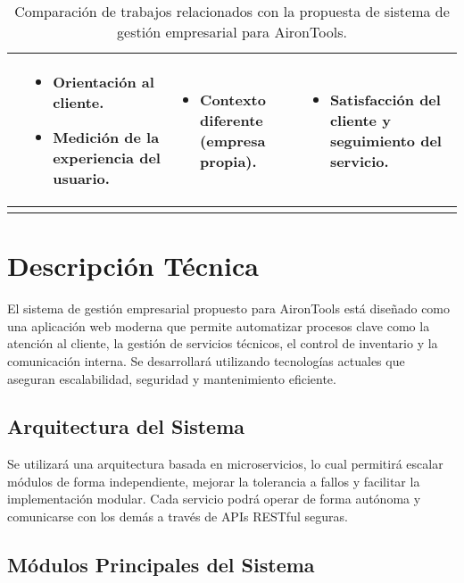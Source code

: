 \begin{longtable}{|p{}|p{}|p{}|p{}|}
    \cite{Patino2019} &
    \begin{itemize}
        \item Orientación al cliente.
        \item Medición de la experiencia del usuario.
    \end{itemize} &
    \begin{itemize}
        \item Contexto diferente (empresa propia).
    \end{itemize} &
    \begin{itemize}
        \item Satisfacción del cliente y seguimiento del servicio.
    \end{itemize} \\
    \hline
    \caption{Comparación de trabajos relacionados con la propuesta de sistema de gestión empresarial para AironTools.}
    \label{tabla:trabajosRelacionados}
    \end{longtable}

    \section{Descripción Técnica}

El sistema de gestión empresarial propuesto para AironTools está diseñado como una aplicación web moderna que permite automatizar procesos clave como la atención al cliente, la gestión de servicios técnicos, el control de inventario y la comunicación interna. Se desarrollará utilizando tecnologías actuales que aseguran escalabilidad, seguridad y mantenimiento eficiente.

\subsection{Arquitectura del Sistema}

Se utilizará una arquitectura basada en microservicios, lo cual permitirá escalar módulos de forma independiente, mejorar la tolerancia a fallos y facilitar la implementación modular. Cada servicio podrá operar de forma autónoma y comunicarse con los demás a través de APIs RESTful seguras.

\subsection{Módulos Principales del Sistema}

